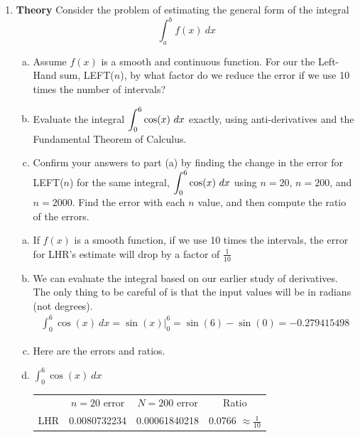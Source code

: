 \begin{enumerate}[1.]
\item \begin{Question}
{\bf Theory} Consider the problem of estimating the general form
  of the integral $$\int_a^b f(x)~dx$$
\begin{enumerate}[(a)]
\item Assume $f(x)$ is a smooth and continuous function.  For our the
  Left-Hand sum, LEFT($n$), by what factor do we reduce the error if
  we use 10 times the number of intervals?

\item Evaluate the integral $\displaystyle \int_0^6 \cos(x)~dx$ exactly, using
  anti-derivatives and the Fundamental Theorem of Calculus.

\item Confirm your answers to part (a) by finding the change in the
  error for LEFT($n$) for the same integral, $\displaystyle \int_0^6 \cos(x)~dx$
  using $n=20$, $n=200$, and $n = 2000$.  Find the error with each $n$
  value, and then compute the ratio of the errors.
\end{enumerate}
\end{Question}

\begin{Solution}
\begin{enumerate}[(a)]
\item If $f(x)$ is a smooth function, if we use 10 times the
  intervals, the error for LHR's estimate will drop by a factor of $\frac{1}{10}$
\item We can evaluate the integral based on our earlier study of
  derivatives. The only thing to be careful of is that the input
  values will be in radians (not degrees).
  \begin{align*}
    \int_0^6 \cos(x)~dx = \sin(x) \Big|_0^6 = \sin(6) - \sin(0) = -0.279415498
  \end{align*}

\item  Here are the errors and ratios.
  \item $\displaystyle \int_0^6 \cos(x)~dx$
\begin{tabular}{ cccc }
& $n=20$ error & $N=200$ error & Ratio \\
LHR &  0.0080732234 & 0.00061840218& 0.0766  $\approx \frac{1}{10}$\\
\end{tabular}
\end{enumerate}
\end{Solution}


\end{enumerate}
